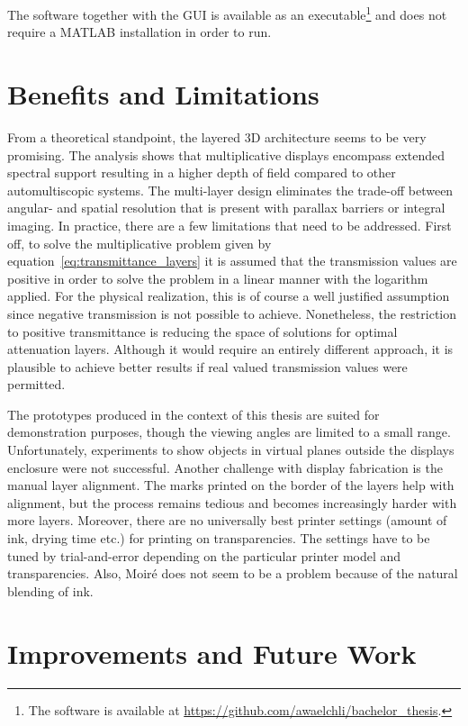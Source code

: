 The software together with the GUI is available as an executable\footnote{The software is available at \url{https://github.com/awaelchli/bachelor_thesis}.} 
and does not require a \mbox{MATLAB} installation in order to run.

\section{Benefits and Limitations}
\label{sec:benefits_limitations}

From a theoretical standpoint, the layered 3D architecture seems to be very promising.
The analysis shows that multiplicative displays encompass extended spectral support resulting in a higher depth of field compared to other automultiscopic systems.
The multi-layer design eliminates the trade-off between angular- and spatial resolution that is present with parallax barriers or integral imaging.
In practice, there are a few limitations that need to be addressed.
First off, to solve the multiplicative problem given by equation~\ref{eq:transmittance_layers} it is assumed that the transmission values are positive in order to solve the problem in a linear manner with the logarithm applied.
For the physical realization, this is of course a well justified assumption since negative transmission is not possible to achieve.
Nonetheless, the restriction to positive transmittance is reducing the space of solutions for optimal attenuation layers.
Although it would require an entirely different approach, it is plausible to achieve better results if real valued transmission values were permitted.

The prototypes produced in the context of this thesis are suited for demonstration purposes, though the viewing angles are limited to a small range.
Unfortunately, experiments to show objects in virtual planes outside the displays enclosure were not successful.
Another challenge with display fabrication is the manual layer alignment.
The marks printed on the border of the layers help with alignment, but the process remains tedious and becomes increasingly harder with more layers.
Moreover, there are no universally best printer settings (amount of ink, drying time etc.) for printing on transparencies.
The settings have to be tuned by trial-and-error depending on the particular printer model and transparencies.
Also, Moir\'{e} does not seem to be a problem because of the natural blending of ink.

\section{Improvements and Future Work}
\label{sec:future_work}

